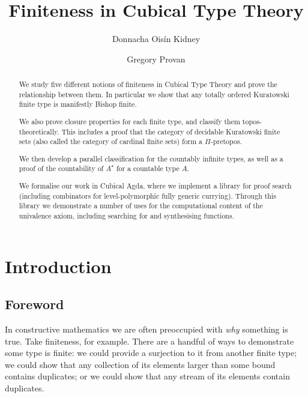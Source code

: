 
\title{Finiteness in Cubical Type Theory}
\author{
  Donnacha Oisín Kidney\and Gregory Provan 
}

\maketitle
\begin{abstract}
  We study five different notions of finiteness in Cubical Type Theory and prove
  the relationship between them.
  In particular we show that any totally ordered Kuratowski finite type is
  manifestly Bishop finite.

  We also prove closure properties for each finite type, and classify them
  topos-theoretically.
  This includes a proof that the category of decidable Kuratowski finite sets
  (also called the category of cardinal finite sets) form a \(\Pi\)-pretopos.

  We then develop a parallel classification for the countably infinite types, as
  well as a proof of the countability of \(A^\star\) for a countable type \(A\).

  We formalise our work in Cubical Agda, where we implement a library for proof
  search (including combinators for level-polymorphic fully generic currying).
  Through this library we demonstrate a number of uses for the computational
  content of the univalence axiom, including searching for and synthesising
  functions.
\end{abstract}
\section{Introduction}
\subsection{Foreword}
In constructive mathematics we are often preoccupied with \emph{why} something
is true.
Take finiteness, for example.
There are a handful of ways to demonstrate some type is finite: we could provide
a surjection to it from another finite type; we could show that any collection
of its elements larger than some bound contains duplicates; or we could show
that any stream of its elements contain duplicates.

